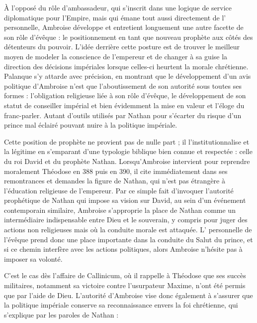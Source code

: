 À l'opposé du rôle d'ambassadeur, qui s'inscrit dans une logique de service diplomatique pour l'Empire, mais qui émane tout aussi directement de l' personnelle, Ambroise développe et entretient longuement une autre facette de son rôle d'évêque : le positionnement en tant que nouveau prophète aux côtés des détenteurs du pouvoir. L'idée derrière cette posture est de trouver le meilleur moyen de modeler la conscience de l'empereur et de changer à sa guise la direction des décisions impériales lorsque celles-ci heurtent la morale chrétienne. Palanque s'y attarde avec précision, en montrant que le développement d'un avis politique d'Ambroise n'est que l'aboutissement de son autorité sous toutes ses formes : l'obligation religieuse liée à son rôle d'évêque, le développement de son statut de conseiller impérial et bien évidemment la mise en valeur et l'éloge du franc-parler. Autant d'outils utilisés par Nathan pour s'écarter du risque d'un prince mal éclairé pouvant nuire à la politique impériale\autocite[208-210]{palanque_ambroise}.

\bigskip

Cette position de prophète ne provient pas de nulle part ; il l'institutionnalise et la légitime en s'emparant d'une typologie biblique bien connue et respectée : celle du roi David et du prophète Nathan. Lorsqu'Ambroise intervient pour reprendre moralement Théodose en 388 puis en 390, il cite immédiatement dans ses remontrances et demandes la figure de Nathan, qui n'est pas étrangère à l'éducation religieuse de l'empereur. Par ce simple fait d'invoquer l'autorité prophétique de Nathan qui impose sa vision sur David, au sein d'un événement contemporain similaire, Ambroise s'approprie la place de Nathan comme un intermédiaire indispensable entre Dieu et le souverain, y compris pour juger des actions non religieuses mais où la conduite morale est attaquée. L' personnelle de l'évêque prend donc une place importante dans la conduite du Salut du prince, et si ce chemin interfère avec les actions politiques, alors Ambroise n'hésite pas à imposer sa volonté.

\bigskip

C'est le cas dès l'affaire de Callinicum, où il rappelle à Théodose que ses succès militaires, notamment sa victoire contre l'usurpateur Maxime, n'ont été permis que par l'aide de Dieu. L'autorité d'Ambroise vise donc également à s'assurer que la politique impériale conserve sa reconnaissance envers la foi chrétienne, qui s'explique par les paroles de Nathan :

